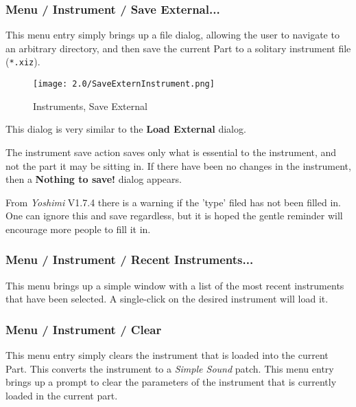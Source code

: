 \subsubsection{Menu / Instrument / Save External...}
\label{subsubsec:menu_instrument_save}

   This menu entry simply brings up a file dialog, allowing the user to
   navigate to an arbitrary directory, and then save the current Part
   to a solitary instrument file (\texttt{*.xiz}).

\begin{figure}[H]
   \centering
   \texttt{[image: 2.0/SaveExternInstrument.png]}
   \caption{Instruments, Save External}
   \label{fig:instruments_save_external}
\end{figure}

   This dialog is very similar to the \textbf{Load External} dialog.

   The instrument save action saves only what is essential to the instrument,
   and not the part it may be sitting in.  If there have been no changes in the
   instrument, then a \textbf{Nothing to save!} dialog appears.

   From \textsl{Yoshimi} V1.7.4 there is a warning if the 'type' filed has
   not been filled in. One can ignore this and save regardless, but it is
   hoped the gentle reminder will encourage more people to fill it in.

\subsubsection{Menu / Instrument / Recent Instruments...}
\label{subsubsec:menu_instrument_recent}

   This menu brings up a simple window with a list of the most recent
   instruments that have been selected.  A single-click on the desired
   instrument will load it.

\subsubsection{Menu / Instrument / Clear}
\label{subsubsec:menu_instrument_clear}

   This menu entry simply clears the instrument that is loaded into the current
   Part.  This converts the instrument to a
   \textsl{Simple Sound} patch.
   This menu entry brings up a prompt to clear the parameters of the
   instrument that is currently loaded in the current part.

